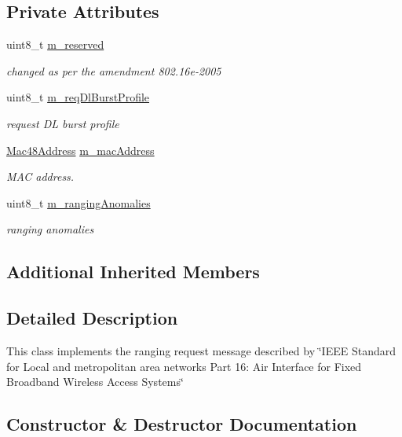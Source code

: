 \subsection*{Private Attributes}
\begin{DoxyCompactItemize}
\item 
uint8\+\_\+t \hyperlink{classns3_1_1RngReq_a7c560a2f40ebadea1b47737325d02bf6}{m\+\_\+reserved}
\begin{DoxyCompactList}\small\item\em changed as per the amendment 802.\+16e-\/2005 \end{DoxyCompactList}\item 
uint8\+\_\+t \hyperlink{classns3_1_1RngReq_abe2a3f531586c0df7b1f265ad87d96f5}{m\+\_\+req\+Dl\+Burst\+Profile}
\begin{DoxyCompactList}\small\item\em request DL burst profile \end{DoxyCompactList}\item 
\hyperlink{classns3_1_1Mac48Address}{Mac48\+Address} \hyperlink{classns3_1_1RngReq_af66fa32303bd76599eeaf8f6e2fb1fe6}{m\+\_\+mac\+Address}
\begin{DoxyCompactList}\small\item\em M\+AC address. \end{DoxyCompactList}\item 
uint8\+\_\+t \hyperlink{classns3_1_1RngReq_a08c2d45b0e438f7865807e046087e082}{m\+\_\+ranging\+Anomalies}
\begin{DoxyCompactList}\small\item\em ranging anomalies \end{DoxyCompactList}\end{DoxyCompactItemize}
\subsection*{Additional Inherited Members}


\subsection{Detailed Description}
This class implements the ranging request message described by \char`\"{}\+I\+E\+E\+E Standard for
\+Local and metropolitan area networks Part 16\+: Air Interface for Fixed Broadband Wireless Access Systems\char`\"{} 

\subsection{Constructor \& Destructor Documentation}
